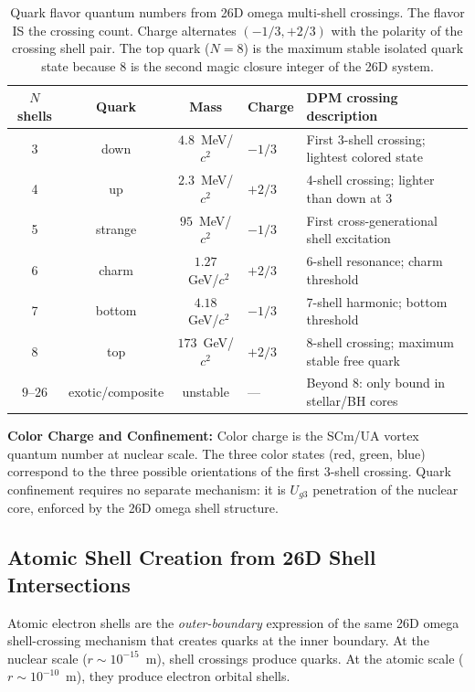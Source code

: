\documentclass[12pt,a4paper]{article}
\begin{document}
\begin{table}[H]
\centering
\begin{tabular}{@{}cccll@{}}
\toprule
$N$ shells & \textbf{Quark} & \textbf{Mass} & \textbf{Charge} & \textbf{DPM crossing description} \\
\midrule
3 & down    & $4.8$~MeV/$c^2$  & $-1/3$ & First 3-shell crossing; lightest colored state \\
4 & up      & $2.3$~MeV/$c^2$  & $+2/3$ & 4-shell crossing; lighter than down at 3 \\
5 & strange & $95$~MeV/$c^2$   & $-1/3$ & First cross-generational shell excitation \\
6 & charm   & $1.27$~GeV/$c^2$ & $+2/3$ & 6-shell resonance; charm threshold \\
7 & bottom  & $4.18$~GeV/$c^2$ & $-1/3$ & 7-shell harmonic; bottom threshold \\
8 & top     & $173$~GeV/$c^2$  & $+2/3$ & 8-shell crossing; maximum stable free quark \\
$9$--$26$ & exotic/composite & unstable & --- & Beyond 8: only bound in stellar/BH cores \\
\bottomrule
\end{tabular}
\caption{Quark flavor quantum numbers from 26D omega multi-shell crossings.
The flavor IS the crossing count.  Charge alternates $(-1/3, +2/3)$ with the
polarity of the crossing shell pair.  The top quark ($N=8$) is the maximum stable
isolated quark state because 8 is the second magic closure integer of the 26D system.}
\label{tab:quarks}
\end{table}

\noindent\textbf{Color Charge and Confinement:}
Color charge is the SCm/UA vortex quantum number at nuclear scale.
The three color states (red, green, blue) correspond to the three possible
orientations of the first 3-shell crossing.
Quark confinement requires no separate mechanism: it is $U_{g3}$ penetration of
the nuclear core, enforced by the 26D omega shell structure.

\subsection{Atomic Shell Creation from 26D Shell Intersections}
\label{sec:atomic_shells}

Atomic electron shells are the \emph{outer-boundary} expression of the same 26D
omega shell-crossing mechanism that creates quarks at the inner boundary.
At the nuclear scale ($r \sim 10^{-15}$~m), shell crossings produce quarks.
At the atomic scale ($r \sim 10^{-10}$~m), they produce electron orbital shells.
\end{document}
